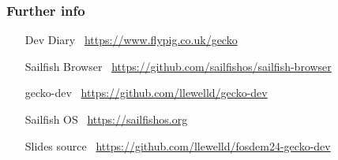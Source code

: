 \documentclass[
	notes=none,
	aspectratio=169
]{beamer}
\begin{document}

\begin{frame}[fragile]
\frametitle{Further info}
\setlength{\leftmargini}{7.0em}
\vspace{0.8cm}

\begin{itemize}
\setlength{\parskip}{1.0em}
\item[Dev Diary] \, \url{https://www.flypig.co.uk/gecko}
\item[Sailfish Browser] \, \url{https://github.com/sailfishos/sailfish-browser}
\item[gecko-dev] \, \url{https://github.com/llewelld/gecko-dev}
\item[Sailfish OS] \, \url{https://sailfishos.org}
\item[Slides source] \, \url{https://github.com/llewelld/fosdem24-gecko-dev}
\end{itemize}

\end{frame}

\end{document}
